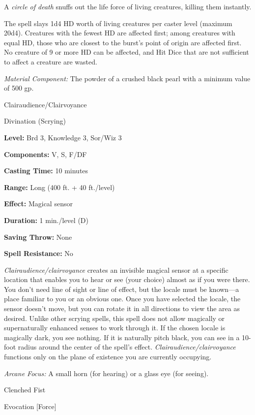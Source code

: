 \documentclass{article}
\begin{document}
A \textit{circle of death }snuffs out the life force of living creatures, killing 
them instantly.

The spell slays 1d4 HD worth of living creatures per caster level (maximum 20d4). 
Creatures with the fewest HD are affected first; among creatures with equal HD, 
those who are closest to the burst's point of origin are affected first. No creature 
of 9 or more HD can be affected, and Hit Dice that are not sufficient to affect 
a creature are wasted.

\textit{Material Component: }The powder of a crushed black pearl with a minimum 
value of 500 gp.

\vspace{12pt}
Clairaudience/Clairvoyance

Divination (Scrying)

\textbf{Level:} Brd 3, Knowledge 3, Sor/Wiz 3

\textbf{Components:} V, S, F/DF

\textbf{Casting Time:} 10 minutes

\textbf{Range:} Long (400 ft. + 40 ft./level)

\textbf{Effect: }Magical sensor

\textbf{Duration:} 1 min./level (D)

\textbf{Saving Throw:} None

\textbf{Spell Resistance:} No

\textit{Clairaudience/clairvoyance }creates an invisible magical sensor at a specific 
location that enables you to hear or see (your choice) almost as if you were there. 
You don't need line of sight or line of effect, but the locale must be known---a 
place familiar to you or an obvious one. Once you have selected the locale, the 
sensor doesn't move, but you can rotate it in all directions to view the area as 
desired. Unlike other scrying spells, this spell does not allow magically or supernaturally 
enhanced senses to work through it. If the chosen locale is magically dark, you 
see nothing. If it is naturally pitch black, you can see in a 10- foot radius around 
the center of the spell's effect. \textit{Clairaudience/clairvoyance }functions 
only on the plane of existence you are currently occupying.

\textit{Arcane Focus: }A small horn (for hearing) or a glass eye (for seeing).

\vspace{12pt}
Clenched Fist

Evocation [Force]
\end{document}
